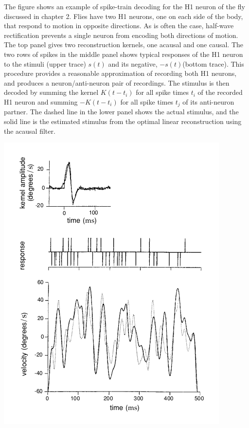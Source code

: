 \begin{exm}
  \label{exm:spike-train decoding for the H1 neuron}
  The figure shows an example of spike-train decoding for the H1 neuron
of the fly discussed in chapter 2. Flies have two H1 neurons, one on
each side of the body, that respond to motion in opposite
directions. As is often the case, half-wave rectification prevents a
single neuron from encoding both directions of motion. The top panel
gives two reconstruction kernels, one acausal and one causal. The two
rows of spikes in the middle panel shows typical responses of the H1
neuron to the stimuli (upper trace)  $s(t)$ and its negative,
$-s(t)$(bottom trace). This procedure provides a reasonable
approximation of recording both H1 neurons, and produces a
neuron/anti-neuron pair of recordings. The stimulus is then decoded by summing the kernel $K(t-t_{i})$ for all spike times $t_{i}$ of
the recorded H1 neuron and summing $-K(t-t_{i})$ for all spike times $t_{j}$ of its anti-neuron partner. The dashed line in the lower panel shows the actual stimulus, and the solid line
is the estimated stimulus from the optimal linear reconstruction using the acausal
filter.
\begin{center}
  \includegraphics[scale = 0.5]{./png/3-14}
\end{center}
\end{exm}
